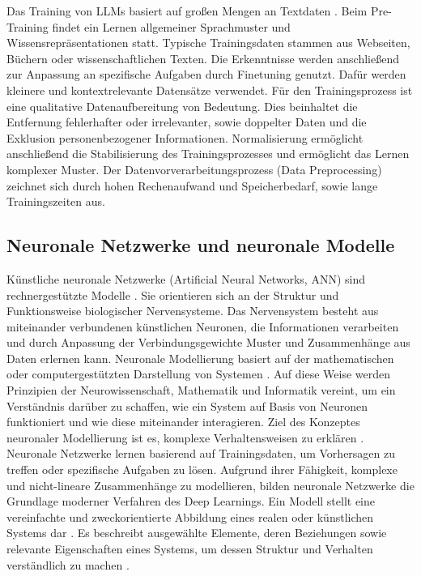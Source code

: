 Das Training von LLMs basiert auf großen Mengen an Textdaten \citep{Raiaan2024A}. Beim Pre-Training findet ein Lernen allgemeiner Sprachmuster und Wissensrepräsentationen statt. Typische Trainingsdaten stammen aus Webseiten, Büchern oder wissenschaftlichen Texten. Die Erkenntnisse werden anschließend zur Anpassung an spezifische Aufgaben durch Finetuning genutzt. Dafür werden kleinere und kontextrelevante Datensätze verwendet. Für den Trainingsprozess ist eine qualitative Datenaufbereitung von Bedeutung. Dies beinhaltet die Entfernung fehlerhafter oder irrelevanter, sowie doppelter Daten und die Exklusion personenbezogener Informationen. Normalisierung ermöglicht anschließend die Stabilisierung des Trainingsprozesses und ermöglicht das Lernen komplexer Muster. Der Datenvorverarbeitungsprozess (Data Preprocessing) zeichnet sich durch hohen Rechenaufwand und Speicherbedarf, sowie lange Trainingszeiten aus.

\subsection{Neuronale Netzwerke und neuronale Modelle}
Künstliche neuronale Netzwerke (Artificial Neural Networks, ANN) sind rechnergestützte Modelle \citep{grum2022construction}. Sie orientieren sich an der Struktur und Funktionsweise biologischer Nervensysteme. Das Nervensystem besteht aus miteinander verbundenen künstlichen Neuronen, die Informationen verarbeiten und durch Anpassung der Verbindungsgewichte Muster und Zusammenhänge aus Daten erlernen kann. 
Neuronale Modellierung basiert auf der mathematischen oder computergestützten Darstellung von Systemen \citep{nielsen2015neural,kinnebrock2018neuronale}. Auf diese Weise werden Prinzipien der Neurowissenschaft, Mathematik und Informatik vereint, um ein Verständnis darüber zu schaffen, wie ein System auf Basis von Neuronen funktioniert und wie diese miteinander interagieren. Ziel des Konzeptes neuronaler Modellierung ist es, komplexe Verhaltensweisen zu erklären \citep{nielsen2015neural}.  
Neuronale Netzwerke lernen basierend auf Trainingsdaten, um Vorhersagen zu treffen oder spezifische Aufgaben zu lösen. Aufgrund ihrer Fähigkeit, komplexe und nicht-lineare Zusammenhänge zu modellieren, bilden neuronale Netzwerke die Grundlage moderner Verfahren des Deep Learnings. Ein Modell stellt eine vereinfachte und zweckorientierte Abbildung eines realen oder künstlichen Systems dar \citep{grum2022construction}. Es beschreibt ausgewählte Elemente, deren Beziehungen sowie relevante Eigenschaften eines Systems, um dessen Struktur und Verhalten verständlich zu machen \citep{kinnebrock2018neuronale}. 

